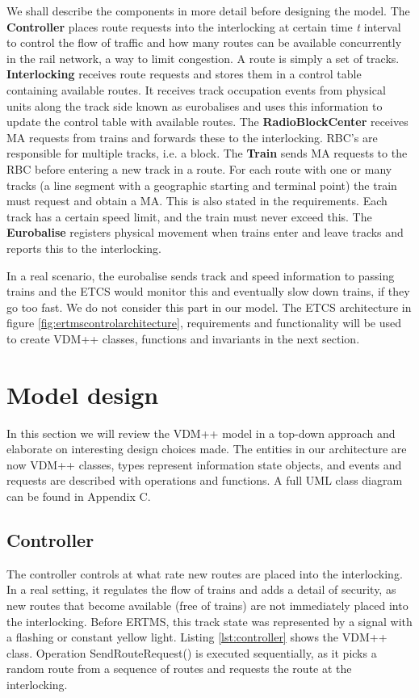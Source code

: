 \documentclass[preprint,12pt]{elsarticle}
\begin{document}
We shall describe the components in more detail before designing the model. The \textbf{Controller} places route requests into the interlocking at certain time \textit{t} interval to control the flow of traffic and how many routes can be available concurrently in the rail network, a way to limit congestion. A route is simply a set of tracks. \textbf{Interlocking} receives route requests and stores them in a control table containing available routes. It receives track occupation events from physical units along the track side known as eurobalises and uses this information to update the control table with available routes. The \textbf{RadioBlockCenter} receives MA requests from trains and forwards these to the interlocking. RBC's are responsible for multiple tracks, i.e. a block. The \textbf{Train} sends MA requests to the RBC before entering a new track in a route. For each route with one or many tracks (a line segment with a geographic starting and terminal point) the train must request and obtain a MA. This is also stated in the requirements. Each track has a certain speed limit, and the train must never exceed this. The \textbf{Eurobalise} registers physical movement when trains enter and leave tracks and reports this to the interlocking. 

In a real scenario, the eurobalise sends track and speed information to passing trains and the ETCS would monitor this and eventually slow down trains, if they go too fast. We do not consider this part in our model. The ETCS architecture in figure \ref{fig:ertmscontrolarchitecture}, requirements and functionality will be used to create VDM++ classes, functions and invariants in the next section.

\section{Model design}

In this section we will review the VDM++ model in a top-down approach and elaborate on interesting design choices made. The entities in our architecture are now VDM++ classes, types represent information state objects, and events and requests are described with operations and functions. A full UML class diagram can be found in Appendix C.

\subsection{Controller}

The controller controls at what rate new routes are placed into the interlocking. In a real setting, it regulates the flow of trains and adds a detail of security, as new routes that become available (free of trains) are not immediately placed into the interlocking. Before ERTMS, this track state was represented by a signal with a flashing or constant yellow light. Listing \ref{lst:controller} shows the VDM++ class. Operation SendRouteRequest() is executed sequentially, as it picks a random route from a sequence of routes and requests the route at the interlocking.
\end{document}
